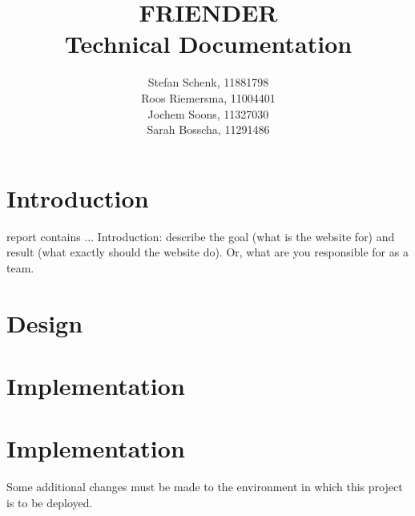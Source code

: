 \documentclass[journal]{IEEEtran}
\begin{document}
\title{FRIENDER\\
	\large{Technical Documentation}}
\author{Stefan Schenk, 11881798\\
Roos Riemersma, 11004401\\
Jochem Soons, 11327030\\
Sarah Bosscha, 11291486}


\maketitle

\section{Introduction}
 report contains ...
Introduction: describe the goal (what is the website for) and result (what
exactly should the website do). Or, what are you responsible for as a team.

\section{Design}
\label{subsec:design}

\section{Implementation}
\label{subsec:implementation}

\section{Implementation}
\label{subsec:installation}
Some additional changes must be made to the environment in which this project
is to be deployed.
\end{document}

